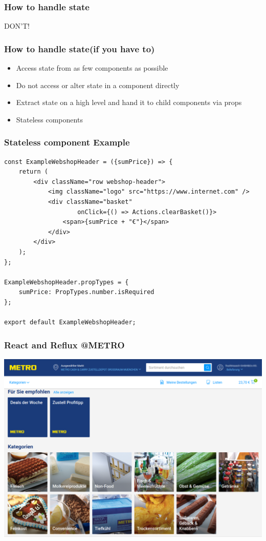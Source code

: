 \documentclass{beamer}
\begin{document}
\begin{frame}\frametitle{How to handle state}
\vspace*{\fill}
\begin{center}
\begin{minipage}{.6\textwidth}
DON'T!
\end{minipage}
\end{center}
\vfill %
\end{frame}

\begin{frame}\frametitle{How to handle state\newline(if you have to)}
\begin{itemize}
\item Access state from as few components as possible
\item Do not access or alter state in a component directly
\item Extract state on a high level and hand it to child components via props
\item Stateless components
\end{itemize}
\end{frame}

\begin{frame}[fragile]\frametitle{Stateless component \textendash{} Example}
\begin{lstlisting}[style=htmlcssjs]
const ExampleWebshopHeader = ({sumPrice}) => {
    return (
        <div className="row webshop-header">
            <img className="logo" src="https://www.internet.com" />
            <div className="basket" 
                    onClick={() => Actions.clearBasket()}>
                <span>{sumPrice + "€"}</span>
            </div>
        </div>
    );
};

ExampleWebshopHeader.propTypes = {
    sumPrice: PropTypes.number.isRequired
};

export default ExampleWebshopHeader;
\end{lstlisting}
\end{frame}

\begin{frame}\frametitle{React and Reflux @METRO}
\centering
\includegraphics[width=.85\linewidth,height=.85\textheight,keepaspectratio]{pics/betty.png}
\end{frame}
\end{document}
